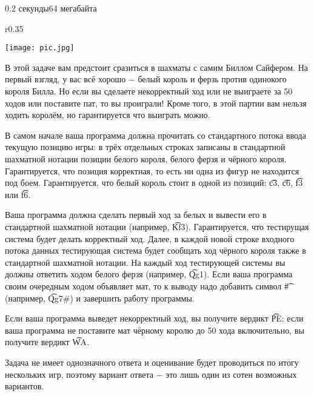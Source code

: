\begin{problem}{}{}{}{0.2 секунды}{64 мегабайта}

\begin{wrapfigure}{r}{0.35\textwidth}
\vspace{-20pt}
  \begin{center}
    \texttt{[image: pic.jpg]}
  \end{center}
  \vspace{-20pt}
  \vspace{1pt}
\end{wrapfigure}

В этой задаче вам предстоит сразиться в шахматы с самим Биллом Сайфером.
На первый взгляд, у вас всё хорошо $-$ белый король и ферзь против одинокого короля Билла.
Но если вы сделаете некорректный ход или не выиграете за 50 ходов или поставите пат, то вы проиграли!
Кроме того, в этой партии вам нельзя ходить королём, но гарантируется что выиграть можно.

\InputFile
В самом начале ваша программа должна прочитать со стандартного потока ввода текущую позицию игры:
в трёх отдельных строках записаны в стандартной шахматной нотации позиции белого короля, белого ферзя и чёрного короля.
Гарантируется, что позиция корректная, то есть ни одна из фигур не находится под боем.
Гарантируется, что белый король стоит в одной из позиций: {\t{c3}}, {\t{c6}}, {\t{f3}} или {\t{f6}}.

\OutputFile
Ваша программа должна сделать первый ход за белых и вывести его в стандартной шахматной нотации (например, {\t{Kf3}}).
Гарантируется, что тестирущая система будет делать корректный ход.
Далее, в каждой новой строке входного потока данных тестирующая система будет сообщать ход чёрного короля 
также в стандартной шахматной нотации. На каждый ход тестирующей системы вы должны ответить ходом белого ферзя (например, {\t{Qg1}}). 
Если ваша программа своим очередным ходом объявляет мат, то к выводу надо добавить символ {\t{\#}}
(например, {\t{Qg7\#}}) и завершить работу программы.

Если ваша программа выведет некорректный ход, вы получите вердикт {\t{PE}}; если ваша программа 
не поставите мат чёрному королю до 50 хода включительно, вы получите вердикт {\t{WA}}.

\Example
\begin{example}
%
\end{example}

\Note
Задача не имеет однозначного ответа и оценивание будет проводиться по итогу нескольких игр,
поэтому вариант ответа $-$ это лишь один из сотен возможных вариантов.

\end{problem}

